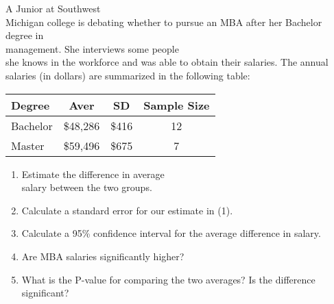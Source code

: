 \documentclass[11pt]{book}\usepackage[]{graphicx}\usepackage[]{color}
\begin{document}
\begin{exercises}
\begin{exercise}
\end{exercise}
\begin{solution}  %

\end{solution}

\begin{exercise}  %

A Junior at Southwest \\ Michigan college is debating whether to pursue an MBA after her Bachelor degree in \\ management.  She interviews some people \\ she  knows in the workforce and was able to obtain their salaries. The annual salaries (in dollars) are summarized in the following table:

\begin{tabular}{@{} lccc @{}} \hline
Degree & Aver & SD & Sample Size \\ \hline
Bachelor & \$48,286 & \$416 & 12 \\
Master   & \$59,496 & \$675 & 7 \\ \hline
\end{tabular}

\begin{enumerate}
  \item Estimate the difference in average \\ salary between the two groups.
  \item Calculate a standard error for our estimate in (1).
  \item Calculate a 95\% confidence interval for the average difference in salary.
  \item Are MBA salaries significantly higher?
  \item What is the P-value for comparing the two averages? Is the difference significant?
\end{enumerate}
\end{exercise}  
\begin{solution}  %

\end{solution}

\begin{exercise}  %


\end{exercise}
\end{exercises}
\end{document}
